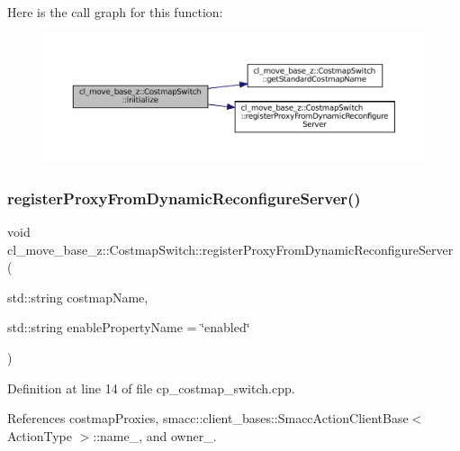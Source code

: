 Here is the call graph for this function\+:
\nopagebreak
\begin{figure}[H]
\begin{center}
\leavevmode
\includegraphics[width=350pt]{classcl__move__base__z_1_1CostmapSwitch_af629ac6f390f90c0b6ad1008fa6b2586_cgraph}
\end{center}
\end{figure}
\mbox{\label{classcl__move__base__z_1_1CostmapSwitch_a0d04ca7b655f850ba3107393f1c437cb}} 
\subsubsection{\texorpdfstring{register\+Proxy\+From\+Dynamic\+Reconfigure\+Server()}{registerProxyFromDynamicReconfigureServer()}}
{\footnotesize\ttfamily void cl\+\_\+move\+\_\+base\+\_\+z\+::\+Costmap\+Switch\+::register\+Proxy\+From\+Dynamic\+Reconfigure\+Server (\begin{DoxyParamCaption}\item[{std\+::string}]{costmap\+Name,  }\item[{std\+::string}]{enable\+Property\+Name = {\ttfamily \char`\"{}enabled\char`\"{}} }\end{DoxyParamCaption})}



Definition at line 14 of file cp\+\_\+costmap\+\_\+switch.\+cpp.



References costmap\+Proxies, smacc\+::client\+\_\+bases\+::\+Smacc\+Action\+Client\+Base$<$ Action\+Type $>$\+::name\+\_\+, and owner\+\_\+.



